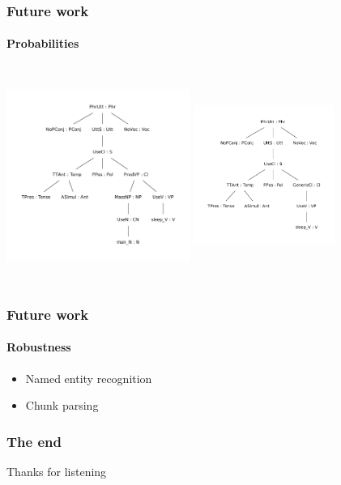 \documentclass[10pt]{beamer}
\renewcommand{\baselinestretch}{1.5}
\begin{document}
\begin{frame}
\renewcommand{\baselinestretch}{1.0}
\frametitle{Future work}
\framesubtitle{Probabilities} 
\includegraphics[width=170pt,height=200pt]{mana1.pdf}
\includegraphics[width=130pt,height=200pt]{mana.pdf}
\end{frame}


\begin{frame}
\frametitle{Future work}
\framesubtitle{Robustness} 
\begin{itemize}
\item Named entity recognition\\
\item Chunk parsing \\
\end{itemize}
\end{frame}


\begin{frame}
    \frametitle{The end}
\large\begin{center}Thanks for listening\end{center}
\end{frame}
\end{document}
